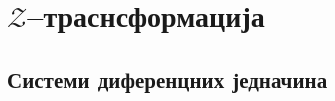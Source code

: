 \setcounter{fid}{0}
\graphicspath{{./5_odabiranje/1_kola/}}
\noindent

\vspace*{\ProblemSep}
\section{$\mathcal{Z}$--траснсформација}
\subsection{Системи диференцних једначина}

\setcounter{fid}{0}
\graphicspath{{./6_z_transformacija/2_sistemi/}}
\noindent

\vspace*{\ProblemSep}
\appendix
\appendix
\graphicspath{{./100_appendix/}}




